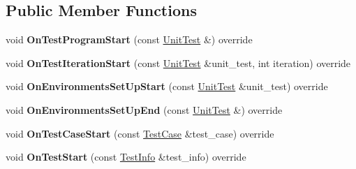 \subsection*{Public Member Functions}
\begin{DoxyCompactItemize}
\item 
\mbox{\label{classtesting_1_1internal_1_1PrettyUnitTestResultPrinter_a248840fde373e65a25eaaa1d2a0f3065}} 
void {\bfseries On\+Test\+Program\+Start} (const \mbox{\hyperlink{classtesting_1_1UnitTest}{Unit\+Test}} \&) override
\item 
\mbox{\label{classtesting_1_1internal_1_1PrettyUnitTestResultPrinter_a0e7e8909452ef92aaf02f4cffde5ee28}} 
void {\bfseries On\+Test\+Iteration\+Start} (const \mbox{\hyperlink{classtesting_1_1UnitTest}{Unit\+Test}} \&unit\+\_\+test, int iteration) override
\item 
\mbox{\label{classtesting_1_1internal_1_1PrettyUnitTestResultPrinter_ac17a4a708aca7df5876e48868408a2be}} 
void {\bfseries On\+Environments\+Set\+Up\+Start} (const \mbox{\hyperlink{classtesting_1_1UnitTest}{Unit\+Test}} \&unit\+\_\+test) override
\item 
\mbox{\label{classtesting_1_1internal_1_1PrettyUnitTestResultPrinter_a9853207ad1aedfe89c72f8047ac3541a}} 
void {\bfseries On\+Environments\+Set\+Up\+End} (const \mbox{\hyperlink{classtesting_1_1UnitTest}{Unit\+Test}} \&) override
\item 
\mbox{\label{classtesting_1_1internal_1_1PrettyUnitTestResultPrinter_a6f57a94ab15116425b5b1882b4794b56}} 
void {\bfseries On\+Test\+Case\+Start} (const \mbox{\hyperlink{classtesting_1_1TestSuite}{Test\+Case}} \&test\+\_\+case) override
\item 
\mbox{\label{classtesting_1_1internal_1_1PrettyUnitTestResultPrinter_a079ac0eb5f8cdd2511cfd33ef931338b}} 
void {\bfseries On\+Test\+Start} (const \mbox{\hyperlink{classtesting_1_1TestInfo}{Test\+Info}} \&test\+\_\+info) override
\item 

\end{DoxyCompactItemize}
